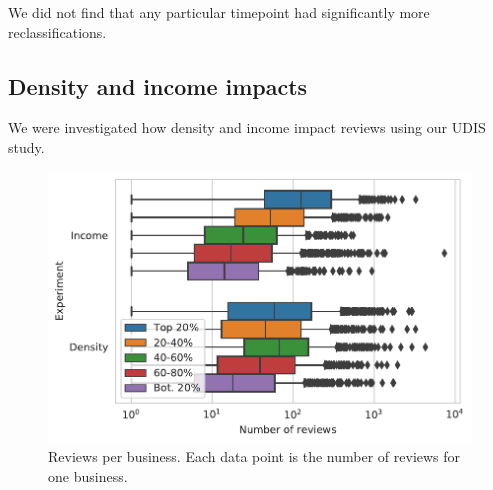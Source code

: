 
We did not find that any particular timepoint had significantly more reclassifications.










\subsection{Density and income impacts}

We were investigated how density and income impact reviews using our UDIS study.



\begin{figure}[t]
    \centering
    \includegraphics[width=0.9\columnwidth]{figures/reviews_per_business_stratified.pdf}
    \caption{Reviews per business. Each data point is the number of reviews for one business. }
    \label{fig:reviews_per_business_stratified}
\end{figure}

